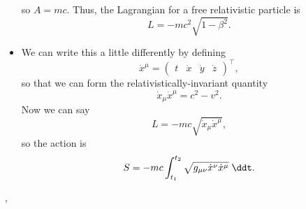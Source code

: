 \begin{itemize}
        so $A = mc$. Thus, the Lagrangian for a free relativistic particle is
        \begin{equation*}
            \boxed{L = -mc^2 \sqrt{1-\beta^2}.}
        \end{equation*}
    \item We can write this a little differently by defining
        \begin{equation}
            \dot{x}^{\mu} = \begin{pmatrix}t & \dot{x} & \dot{y} & \dot{z}\end{pmatrix}^{\intercal},
        \end{equation}
        so that we can form the relativistically-invariant quantity
        \begin{equation}
            \dot{x}_{\mu}\dot{x}^{\mu} = c^2 - v^2.
        \end{equation}
        Now we can say
        \begin{equation*}
            L = -mc\sqrt{\dot{x}_{\mu}\dot{x}^{\mu}},
        \end{equation*}
        so the action is
        \begin{equation*}
            S = -mc \int_{t_1}^{t_2} \sqrt{g_{\mu\nu}\dot{x}^{\nu}\dot{x}^{\mu}} \;\ddt.
        \end{equation*}
\end{itemize}




\sep 



